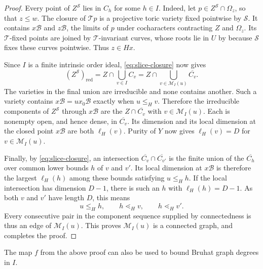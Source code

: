 \documentclass[11pt]{amsart}
\theoremstyle{definition}
\theoremstyle{remark}
\numberwithin{equation}{section}
\begin{document}
\begin{proof}
Every point of $Z^{\mathcal S}$ lies in $C_h$ for some $h\in I$.
Indeed, let $p\in Z^{\mathcal S}\cap\Omega_z$, so that $z\le w$. The
closure of $\mathcal Tp$ is a projective toric variety fixed
pointwise by $\mathcal S$. It contains $x\mathcal{B}$ and
$z\mathcal{B}$, the limits of $p$ under cocharacters contracting
$Z$ and $\Omega_z$. Its $\mathcal T$-fixed points are joined by
$\mathcal T$-invariant curves, whose roots lie in $U$ by
\cite[Prop.~7.2, p.~525]{FW} because $\mathcal S$ fixes these curves
pointwise. Thus $z\in Hx$.

Since $I$ is a finite intrinsic order ideal,
\eqref{eq:slice-closure} now gives
\[
 (Z^{\mathcal S})_{\mathrm{red}}
 =Z\cap\bigcup_{v\in I}C_v
 =Z\cap\bigcup_{v\in \mathcal{M}_I(u)}\overline{C_v}.
\]
The varieties in the final union are irreducible and none
contains another. Such a variety contains $x\mathcal{B}=ux_0\mathcal{B}$
exactly when $u\le_Hv$. Therefore the irreducible components of
$Z^{\mathcal S}$ through $x\mathcal{B}$ are the $Z\cap\overline{C_v}$
with $v\in\mathcal M_I(u)$. Each is nonempty open, and hence dense,
in $\overline{C_v}$.
Its dimension and its local dimension at the closed point $x\mathcal{B}$
are both $\ell_H(v)$. Purity of $Y$ now gives $\ell_H(v)=D$ for $v\in\mathcal M_I(u)$.

Finally, by \eqref{eq:slice-closure}, an intersection
$\overline{C_v}\cap\overline{C_{v'}}$ is the finite union of the
$\overline{C_h}$ over common lower bounds $h$ of $v$ and $v'$. Its local dimension at $x\mathcal{B}$ is
therefore the largest $\ell_H(h)$ among these bounds satisfying
$u\le_Hh$. If the local intersection has dimension $D-1$,
there is such an $h$ with $\ell_H(h)=D-1$. As both $v$ and
$v'$ have length $D$, this means
\[
 u\le_Hh,\qquad h\lessdot_Hv,\qquad h\lessdot_Hv'.
\]
Every consecutive pair in the component sequence supplied by
connectedness is thus an edge of $\mathcal M_I(u)$. This proves $\mathcal{M}_I(u)$ is a connected graph, and completes the proof.
\end{proof}

The map $f$ from the above proof can also be used to bound Bruhat graph degrees in $I$.
\end{document}
